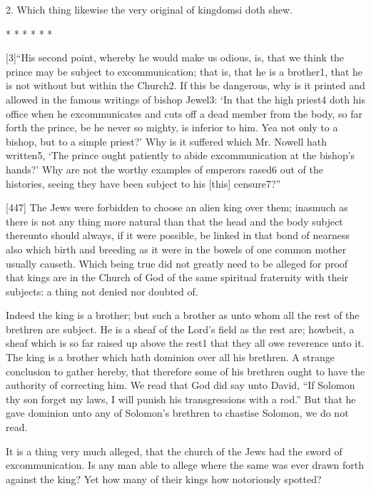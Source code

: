 2. Which thing likewise the very original of kingdomsi doth shew.

* * * * * *

[3]“His second point, whereby he would make us odious, is, that we think the prince may be subject to excommunication; that is, that he is a brother1, that he is not without but within the Church2. If this be dangerous, why is it printed and allowed in the famous writings of bishop Jewel3: ‘In that the high priest4 doth his office when he excommunicates and cuts off a dead member from the body, so far forth the prince, be he never so mighty, is inferior to him. Yea not only to a bishop, but to a simple priest?’ Why is it suffered which Mr. Nowell hath written5, ‘The prince ought patiently to abide excommunication at the bishop’s hands?’ Why are not the worthy examples of emperors rased6 out of the histories, seeing they have been subject to his [this] censure7?”

[447]
The Jews were forbidden to choose an alien king over them; inasmuch as there is not any thing more natural than that the head and the body subject thereunto should always, if it were possible, be linked in that bond of nearness also which birth and breeding as it were in the bowels of one common mother usually causeth. Which being true did not greatly need to be alleged for proof that kings are in the Church of God of the same spiritual fraternity with their subjects: a thing not denied nor doubted of.

Indeed the king is a brother; but such a brother as unto whom all the rest of the brethren are subject. He is a sheaf of the Lord’s field as the rest are; howbeit, a sheaf which is so far raised up above the rest1 that they all owe reverence unto it. The king is a brother which hath dominion over all his brethren. A strange conclusion to gather hereby, that therefore some of his brethren ought to have the authority of correcting him. We read that God did say unto David, “If Solomon thy son forget my laws, I will punish his transgressions with a rod.” But that he gave dominion unto any of Solomon’s brethren to chastise Solomon, we do not read.

It is a thing very much alleged, that the church of the Jews had the sword of excommunication. Is any man able to allege where the same was ever drawn forth against the king? Yet how many of their kings how notoriously spotted?

